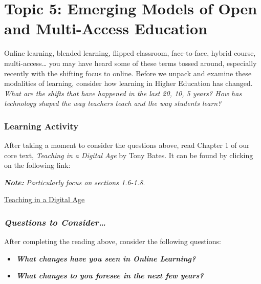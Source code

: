\documentclass[
]{book}
\providecommand{\tightlist}{%
  \setlength{\itemsep}{0pt}\setlength{\parskip}{0pt}}
\begin{document}
\hypertarget{topic-5-emerging-models-of-open-and-multi-access-education}{%
\section*{Topic 5: Emerging Models of Open and Multi-Access Education}\label{topic-5-emerging-models-of-open-and-multi-access-education}}

Online learning, blended learning, flipped classroom, face-to-face, hybrid course, multi-access\ldots{} you may have heard some of these terms tossed around, especially recently with the shifting focus to online. Before we unpack and examine these modalities of learning, consider how learning in Higher Education has changed. \emph{What are the shifts that have happened in the last 20, 10, 5 years? How has technology shaped the way teachers teach and the way students learn?}

\begin{reflect}
\hypertarget{learning-activity-15}{%
\subsubsection*{Learning Activity}\label{learning-activity-15}}

After taking a moment to consider the questions above, read Chapter 1 of our core text, \emph{Teaching in a Digital Age} by Tony Bates. It can be found by clicking on the following link:

\textbf{\emph{Note:}} \emph{Particularly focus on sections 1.6-1.8.}

\href{https://pressbooks.bccampus.ca/teachinginadigitalagev3m/part/chapter-1-fundamental-change-in-education/}{Teaching in a Digital Age}

\hypertarget{questions-to-consider-3}{%
\subsubsection*{\texorpdfstring{\textbf{\emph{Questions to Consider\ldots{}}}}{Questions to Consider\ldots{}}}\label{questions-to-consider-3}}

After completing the reading above, consider the following questions:

\begin{itemize}
\tightlist
\item
  \textbf{\emph{What changes have you seen in Online Learning?}}\\
\item
  \textbf{\emph{What changes to you foresee in the next few years?}}
\end{itemize}
\end{reflect}
\end{document}
